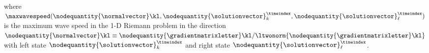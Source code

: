    where $\maxwavespeed(\nodequantity{\normalvector}\kl,
         \nodequantity{\solutionvector}_k^\timeindex,
         \nodequantity{\solutionvector}_\ell^\timeindex)$
  is the maximum wave speed in the 1-D Riemann problem in the direction
  $\nodequantity{\normalvector}\kl \equiv
  \nodequantity{\mathbf{\gradientmatrixletter}}\kl /
  \ltwonorm{\nodequantity{\mathbf{\gradientmatrixletter}}\kl}$
  with left state $\nodequantity{\solutionvector}_k^\timeindex$ and right state
  $\nodequantity{\solutionvector}_\ell^\timeindex$.
